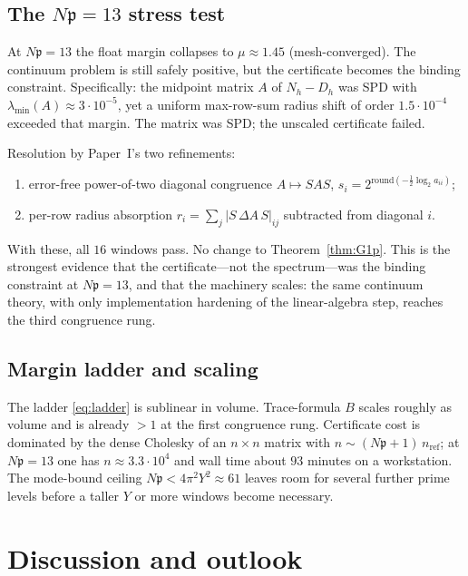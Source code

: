 \documentclass[11pt]{amsart}
\newcommand{\p}{\mathfrak{p}}
\begin{document}
\subsection{The $N\p=13$ stress test}

At $N\p=13$ the float margin collapses to $\mu\approx 1.45$
(mesh-converged).  The continuum problem is still safely positive, but
the certificate becomes the binding constraint.  Specifically: the
midpoint matrix $A$ of $N_h-D_h$ was SPD with
$\lambda_{\min}(A)\approx 3\cdot 10^{-5}$, yet a uniform max-row-sum radius
shift of order $1.5\cdot 10^{-4}$ exceeded that margin.  The matrix was
SPD; the unscaled certificate failed.

Resolution by Paper~I's two refinements:
\begin{enumerate}
\item error-free power-of-two diagonal congruence
  $A\mapsto SAS$, $s_i=2^{\mathrm{round}(-\frac12\log_2 a_{ii})}$;
\item per-row radius absorption $r_i=\sum_j|S\,\Delta A\,S|_{ij}$
  subtracted from diagonal $i$.
\end{enumerate}
With these, all $16$ windows pass.  No change to Theorem~\ref{thm:G1p}.
This is the strongest evidence that the certificate---not the
spectrum---was the binding constraint at $N\p=13$, and that the machinery
scales: the same continuum theory, with only implementation hardening of
the linear-algebra step, reaches the third congruence rung.

\subsection{Margin ladder and scaling}

The ladder \eqref{eq:ladder} is sublinear in volume.  Trace-formula $B$
scales roughly as volume and is already $>1$ at the first congruence
rung.  Certificate cost is dominated by the dense Cholesky of an
$n\times n$ matrix with $n\sim(N\p+1)\,n_{\mathrm{ref}}$; at $N\p=13$ one
has $n\approx 3.3\cdot 10^4$ and wall time about $93$ minutes on a
workstation.  The mode-bound ceiling $N\p<4\pi^2 Y^2\approx 61$ leaves
room for several further prime levels before a taller $Y$ or more
windows become necessary.

\section{Discussion and outlook}
\end{document}
